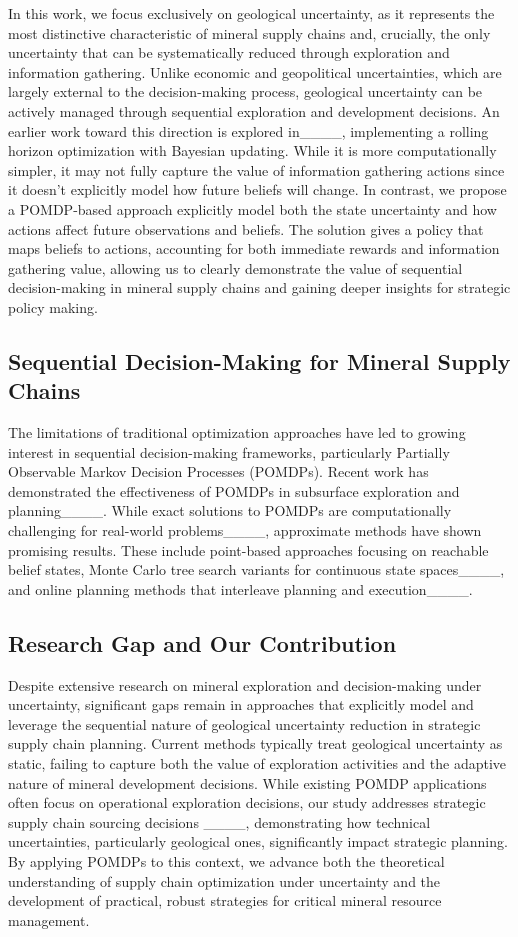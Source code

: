 In this work, we focus exclusively on geological uncertainty, as it represents the most distinctive characteristic of mineral supply chains and, crucially, the only uncertainty that can be systematically reduced through exploration and information gathering. Unlike economic and geopolitical uncertainties, which are largely external to the decision-making process, geological uncertainty can be actively managed through sequential exploration and development decisions. An earlier work toward this direction is explored in____, implementing a rolling horizon optimization with Bayesian updating. While it is more computationally simpler, it may not fully capture the value of information gathering actions since it doesn't explicitly model how future beliefs will change. In contrast, we propose a POMDP-based approach explicitly model both the state uncertainty and how actions affect future observations and beliefs. The solution gives a policy that maps beliefs to actions, accounting for both immediate rewards and information gathering value, allowing us to clearly demonstrate the value of sequential decision-making in mineral supply chains and gaining deeper insights for strategic policy making.


\subsection{Sequential Decision-Making for Mineral Supply Chains}

The limitations of traditional optimization approaches have led to growing interest in sequential decision-making frameworks, particularly Partially Observable Markov Decision Processes (POMDPs). Recent work has demonstrated the effectiveness of POMDPs in subsurface exploration and planning____. While exact solutions to POMDPs are computationally challenging for real-world problems____, approximate methods have shown promising results. These include point-based approaches focusing on reachable belief states, Monte Carlo tree search variants for continuous state spaces____, and online planning methods that interleave planning and execution____. %

\subsection{Research Gap and Our Contribution}
Despite extensive research on mineral exploration and decision-making under uncertainty, significant gaps remain in approaches that explicitly model and leverage the sequential nature of geological uncertainty reduction in strategic supply chain planning. Current methods typically treat geological uncertainty as static, failing to capture both the value of exploration activities and the adaptive nature of mineral development decisions. While existing POMDP applications often focus on operational exploration decisions, our study addresses strategic supply chain sourcing decisions ____, demonstrating how technical uncertainties, particularly geological ones, significantly impact strategic planning. By applying POMDPs to this context, we advance both the theoretical understanding of supply chain optimization under uncertainty and the development of practical, robust strategies for critical mineral resource management.